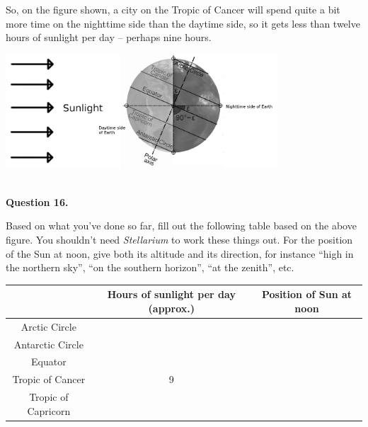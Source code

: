 \documentclass[11pt]{article}
\begin{document}
So, on the figure shown, a city on the Tropic of Cancer will spend quite a bit more time on the nighttime side than the daytime side, so it gets less than twelve hours of
sunlight per day -- perhaps nine hours.

\begin{center}
\includegraphics[width=4in]{earth-rotate-figure.jpg}
\end{center}

\vspace*{1.5cm}
\hrulefill\\

\textbf{Question 16.}

Based on what you've done so far, fill out the following table based on the above figure.
 You shouldn't need {\it Stellarium} to work these things out. For the position of the Sun
at noon, give both its altitude and its direction, for instance ``high in the northern sky'', ``on the southern horizon'', ``at the zenith'', etc.

\begin{center}
\begin{tabular}{|c| c |c|}
\hline
 & Hours of sunlight per day (approx.) & Position of Sun at noon \\
\hline
Arctic Circle & & \\
\hline
Antarctic Circle & &\\
\hline
Equator & & \\
\hline
Tropic of Cancer & 9 & \\
\hline
Tropic of Capricorn & & \\
\hline
\end{tabular}
\normalsize
\end{center}
\end{document}
